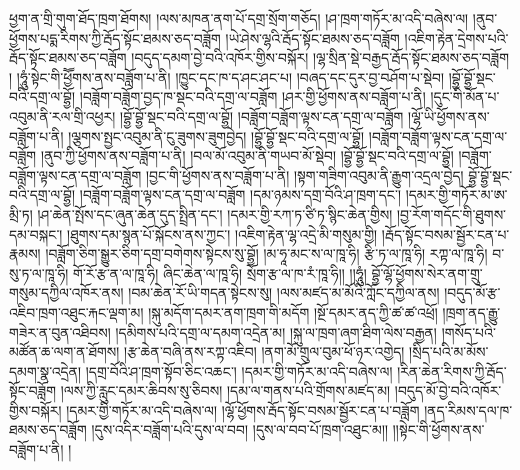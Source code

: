 ཕྱག་ན་གྲི་གུག་ཐོད་ཁྲག་ཐོགས། །ལས་མཁན་ནག་པོ་དགྲ་སྲོག་གཅོད། །ཤ་ཁྲག་གཏོར་མ་འདི་བཞེས་ལ། །ནུབ་ཕྱོགས་པདྨ་རིགས་ཀྱི་རྦོད་སྟོང་ཐམས་ཅད་བཟློག །ཡེ་ཤེས་ལྷའི་རྦོད་སྟོང་ཐམས་ཅད་བཟློག །འཇིག་རྟེན་དྲེགས་པའི་རྦོད་སྟོང་ཐམས་ཅད་བཟློག །བདུད་དམག་བྱེ་བའི་འཁོར་གྱིས་བསྐོར། །ལྷ་སྲིན་སྡེ་བརྒྱད་རྦོད་སྟོང་ཐམས་ཅད་བཟློག ། །ཧཱུཾ་སྟེང་གི་ཕྱཽགས་ནས་བཟློག་པ་ནི། །ཁྱུང་དང་ཁ་ད་ཤང་ཤང་པ། །བཞད་དང་དུར་བྱ་བཤོག་པ་སྡེབ། །བྷྱོ་བྷྱོ་སྡང་བའི་དགྲ་ལ་བྷྱོ། །བཟློག་བཟློག་བྱད་ཁ་སྡང་བའི་དགྲ་ལ་བཟློག །ཤར་གྱི་ཕྱོགས་ནས་བཟློག་པ་ནི། །དུང་གི་མོན་པ་འབུམ་ནི་རལ་གྲི་འཕྱར། །བྷྱོ་བྷྱོ་སྡང་བའི་དགྲ་ལ་བྷྱོ། །བཟློག་བཟློག་ལྟས་ངན་དགྲ་ལ་བཟློག །ལྷོ་ཡི་ཕྱོགས་ནས་བཟློག་པ་ནི། །ལྕགས་སྤྱང་འབུམ་ནི་ངུ་ཟུགས་ཟུགབྱེད། །བྷྱོ་བྷྱོ་སྡང་བའི་དགྲ་ལ་བྷྱོ། །བཟློག་བཟློག་ལྟས་ངན་དགྲ་ལ་བཟློག །ནུབ་ཀྱི་ཕྱོགས་ནས་བཟློག་པ་ནི། །བལ་མོ་འབུམ་ནི་གཡབ་མོ་སྡེབ། །བྷྱོ་བྷྱོ་སྡང་བའི་དགྲ་ལ་བྷྱོ། །བཟློག་བཟློག་ལྟས་ངན་དགྲ་ལ་བཟློག །བྱང་གི་ཕྱོགས་ནས་བཟློག་པ་ནི། །སྟག་གཟིག་འབུམ་ནི་རྒྱུག་འདྲལ་བྱེད། བྷྱོ་བྷྱོ་སྡང་བའི་དགྲ་ལ་བྷྱོ། །བཟློག་བཟློག་ལྟས་ངན་དགྲ་ལ་བཟློག །དམ་ཉམས་དགྲ་བོའི་ཤ་ཁྲག་དང་། །དམར་གྱི་གཏོར་མ་ཨ་མྲི་ཏ། །ཤ་ཆེན་སྤོས་དང་ཞུན་ཆེན་དུད་སྤྲིན་དང་། །དམར་གྱི་རཀ་ཏ་ཙི་ཏ་སྙིང་ཆེན་གྱིས། །བྱ་རོག་གདོང་གི་ཐུགས་དམ་བསྐང་། །ཐུགས་དམ་སྙན་པོ་སྐོངས་ནས་ཀྱང་། །འཇིག་རྟེན་ལྷ་འདྲེ་མི་གསུམ་གྱི། །རྦོད་སྟོང་བསམ་སྦྱོར་ངན་པ་རྣམས། །བཟློག་ཅིག་སྒྱུར་ཅིག་དགྲ་བགེགས་སྟེངས་སུ་བྷྱོ། །མ་ཧཱ་མང་ས་ལ་ཁཱ་ཧི། རྩི་ཏ་ལ་ཁཱ་ཧི། རཀྟ་ལ་ཁཱ་ཧི། བ་སུ་ཏ་ལ་ཁཱ་ཧི། གོ་རོ་རྩ་ན་ལ་ཁཱ་ཧི། ཞིང་ཆེན་ལ་ཁཱ་ཧི། སྲོག་རྩ་ལ་ཁ་རཾ་ཁཱ་ཧི།། །།ཧཱུཾ། བྷྱོ་ལྷོ་ཕྱོགས་སེར་ནག་གྲུ་གསུམ་དཀྱིལ་འཁོར་ནས། །བམ་ཆེན་རོ་ཡི་གདན་སྟེངས་སུ། །ལས་མཛད་མ་མོའི་ཀློང་དཀྱིལ་ནས། །བདུད་མོ་རྩ་འཇིབ་ཁྲག་འཐུང་རྐང་ལྡག་མ། །སྐུ་མདོག་དམར་ནག་ཁྲག་གི་མདོག །སྔོ་དམར་ནད་ཀྱི་ཚ་ཚ་འཕྲོ། །ཁྲག་ནད་རྒྱུ་གཟེར་ན་བུན་འཐིབས། །དམིགས་པའི་དགྲ་ལ་དམག་འདྲེན་མ། །སྐུ་ལ་ཁྲག་ཞག་ཐིག་ལེས་བརྒྱན། །གསོད་པའི་མཚོན་ཆ་ལག་ན་ཐོགས། །རྩ་ཆེན་བཞི་ནས་རཀྟ་འཇིབ། །ནག་མོ་གྲུལ་བུམ་ཕོ་ཉར་འགྱེད། །སྲིད་པའི་མ་མོས་དམག་སྣ་འདྲེན། །དགྲ་བོའི་ཤ་ཁྲག་སྟོབ་ཅིང་འཆང་། །དམར་གྱི་གཏོར་མ་འདི་བཞེས་ལ། །རིན་ཆེན་རིགས་ཀྱི་རྦོད་སྟོང་བཟློག །ལས་ཀྱི་རླུང་དམར་ཆིབས་སུ་ཅིབས། །དམ་ལ་གནས་པའི་གྲོགས་མཛད་མ། །བདུད་མོ་བྱེ་བའི་འཁོར་གྱིས་བསྐོར། །དམར་གྱི་གཏོར་མ་འདི་བཞེས་ལ། །ལྷོ་ཕྱོགས་རྦོད་སྟོང་བསམ་སྦྱོར་ངན་པ་བཟློག །ནད་རིམས་དལ་ཁ་ཐམས་ཅད་བཟློག །དུས་འདིར་བཟློག་པའི་དུས་ལ་བབ། །དུས་ལ་བབ་པོ་ཁྲག་འཐུང་མ།། །།སྟེང་གི་ཕྱོགས་ནས་བཟློག་པ་ནི། །

